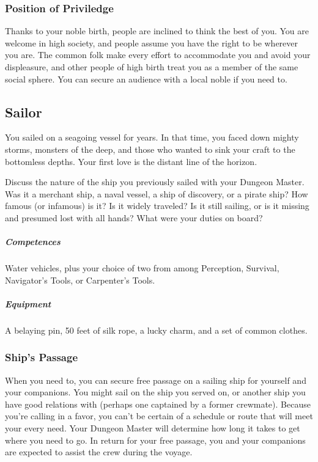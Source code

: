     \subsubsection{Position of Priviledge}
        Thanks to your noble birth, people are inclined to think the best of you.
        You are welcome in high society, and people assume you have the right to be wherever you are.
        The common folk make every effort to accommodate you and avoid your displeasure, and other people of high birth treat you as a member of the same social sphere.
        You can secure an audience with a local noble if you need to.

\subsection*{Sailor} \label{ssec::sailor}
    You sailed on a seagoing vessel for years.
    In that time, you faced down mighty storms, monsters of the deep, and those who wanted to sink your craft to the bottomless depths.
    Your first love is the distant line of the horizon.

    Discuss the nature of the ship you previously sailed with your Dungeon Master.
    Was it a merchant ship, a naval vessel, a ship of discovery, or a pirate ship?
    How famous (or infamous) is it?
    Is it widely traveled?
    Is it still sailing, or is it missing and presumed lost with all hands?
    What were your duties on board?
    \subparagraph{Competences} Water vehicles, plus your choice of two from among Perception, Survival, Navigator's Tools, or Carpenter's Tools.
    \subparagraph{Equipment} A belaying pin, 50 feet of silk rope, a lucky charm, and a set of common clothes.
    \subsubsection{Ship's Passage}
        When you need to, you can secure free passage on a sailing ship for yourself and your companions.
        You might sail on the ship you served on, or another ship you have good relations with (perhaps one captained by a former crewmate).
        Because you're calling in a favor, you can't be certain of a schedule or route that will meet your every need.
        Your Dungeon Master will determine how long it takes to get where you need to go.
        In return for your free passage, you and your companions are expected to assist the crew during the voyage.

